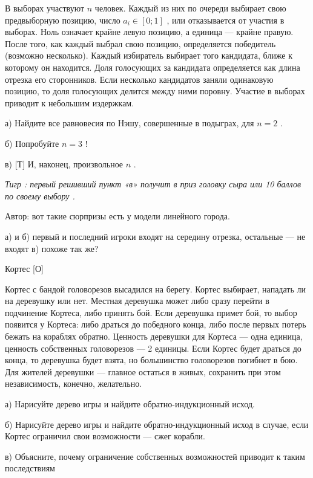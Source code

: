\begin{problem}
 \par
В выборах участвуют  $n$  человек. Каждый из них по очереди выбирает свою предвыборную позицию, число  $a_{i} \in \left[0;1\right]$ , или отказывается от участия в выборах. Ноль означает крайне левую позицию, а единица — крайне правую. После того, как каждый выбрал свою позицию, определяется победитель (возможно несколько). Каждый избиратель выбирает того кандидата, ближе к которому он находится. Доля голосующих за кандидата определяется как длина отрезка его сторонников. Если несколько кандидатов заняли одинаковую позицию, то доля голосующих делится между ними поровну. Участие в выборах приводит к небольшим издержкам.\par
а) Найдите все равновесия по Нэшу, совершенные в подыграх, для  $n=2$ .\par
б) Попробуйте  $n=3$ !\par
в) [Т] И, наконец, произвольное  $n$ .\par
{\it Тигр : первый решивший пункт «в» получит в приз головку сыра или 10 баллов по своему выбору .}\par
Автор: вот такие сюрпризы есть у модели линейного города.\par



\begin{sol}
а) и б) первый и последний игроки входят на середину отрезка, остальные — не входят в) похоже так же?
\end{sol}
\end{problem}



\begin{problem}
 Кортес [О]\par
Кортес с бандой головорезов высадился на берегу. Кортес выбирает, нападать ли на деревушку или нет. Местная деревушка может либо сразу перейти в подчинение Кортеса, либо принять бой. Если деревушка примет бой, то выбор появится у Кортеса: либо драться до победного конца, либо после первых потерь бежать на кораблях обратно. Ценность деревушки для Кортеса — одна единица, ценность собственных головорезов — 2 единицы. Если Кортес будет драться до конца, то деревушка будет взята, но большинство головорезов погибнет в бою. Для жителей деревушки — главное остаться в живых, сохранить при этом независимость, конечно, желательно.\par
а) Нарисуйте дерево игры и найдите обратно-индукционный исход.\par
б) Нарисуйте дерево игры и найдите обратно-индукционный исход в случае, если Кортес ограничил свои возможности — сжег корабли.\par
в) Объясните, почему ограничение собственных возможностей приводит к таким последствиям \par



\begin{sol}

\end{sol}
\end{problem}



